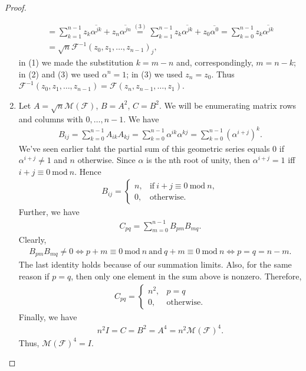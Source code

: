 \documentclass{extarticle}
\begin{document}
\begin{proof}
\begin{enumerate}[label=(\alph*)]
\begin{gather*}
        =
        \sum_{k=1}^{n-1} z_{k} \overline{\alpha^{jk}} + z_n \overline{\alpha^{jn}}
        \overset{(3)}{=}
        \sum_{k=1}^{n-1} z_{k} \overline{\alpha^{jk}} + z_0 \overline{\alpha^{0}}
        =
        \sum_{k=0}^{n-1} z_{k} \overline{\alpha^{jk}}
        \\ =
        {\sqrt{n}} \mathcal{F}^{-1} (z_0, z_1, \ldots, z_{n-1})_{j},
    \end{gather*}
    in (1) we made the substitution \( k = m - n \) and, correspondingly, \( m = n -k \);
    in (2) and (3) we used \( \alpha^n = 1 \);
    in (3) we used \( z_n = z_0 \).
    Thus \(\mathcal{F}^{-1}  (z_0, z_1, \ldots, z_{n-1}) =
                \mathcal{F} (z_n, z_{n-1}, \ldots, z_{1}) \).
    \item
        Let \( A = \sqrt{n} \mathcal{M}(\mathcal{F})\), \( B  = A^2 \), \( C = B^2 \).
        We will be enumerating matrix rows and columns with \( 0, \dots, n-1 \).
        We have
    \begin{gather*}
        B_{ij} = \sum_{k=0}^{n-1}{A_{ik} A_{kj}}
        = \sum_{k=0}^{n-1}{\alpha^{ik} \alpha^{kj}}
        = \sum_{k=0}^{n-1}(\alpha^{i+j})^{k}.
    \end{gather*}
    We've seen earlier taht the partial sum of this geometric series
    equals 0 if \( \alpha^{i+j} \ne 1 \) and \( n \) otherwise.
    Since \( \alpha \) is the nth root of unity, then \( \alpha^{i+j} = 1 \) iff
    \( i+j \equiv 0  ~\mathrm{mod}~ n \).  Hence
    \begin{gather*}
        B_{ij} =
        \begin{cases}
            n, & \mathrm{if}~i+j \equiv 0  ~\mathrm{mod}~ n, \\
            0, & \mathrm{otherwise}.
        \end{cases}
    \end{gather*}
    Further, we have
    \begin{gather*}
        C_{pq} = \sum_{m=0}^{n-1} B_{pm} B_{mq}.
    \end{gather*}
    Clearly,
    \begin{gather*}
        B_{pm} B_{mq} \ne 0 \iff p+m \equiv 0  ~\mathrm{mod}~ n
        ~\text{and}~ q+m \equiv 0  ~\mathrm{mod}~ n
        \iff p = q = n - m.
    \end{gather*}
    The last identity holds because of our summation limits. Also, for the
    same reason if \( p=q \),
    then only one element in the sum above is nonzero.
    Therefore,
    \begin{gather}
        C_{pq} =
        \begin{cases}
            n^2, & p=q \\
            0, & \mathrm{otherwise}.
        \end{cases}
    \end{gather}
    Finally, we have
    \begin{gather*}
        n^2 I = C = B^2 = A^4 = n^2 \mathcal{M}(\mathcal{F})^4.
    \end{gather*}
    Thus, \(  \mathcal{M}(\mathcal{F})^4 = I\).
    \end{enumerate}
\end{proof}
\end{document}
